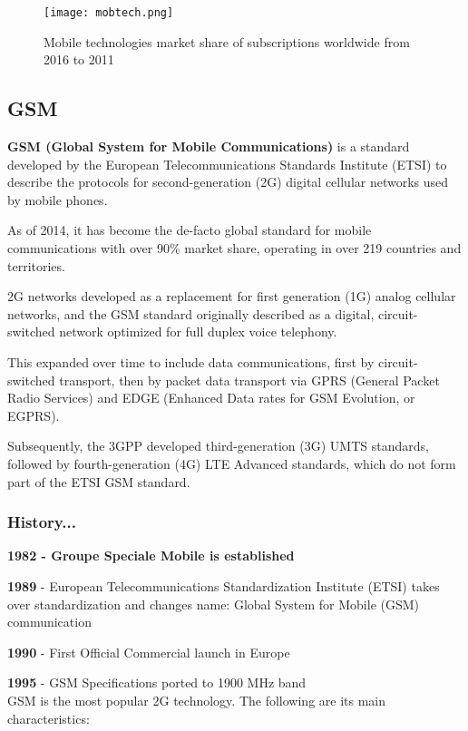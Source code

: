 \begin{figure}[H]
  \centering
  \texttt{[image: mobtech.png]}
  \caption{Mobile technologies market share of subscriptions worldwide from
  2016 to 2011}
  \label{fig:mobtech}
\end{figure}

\subsection{GSM}

\textbf{GSM (Global System for Mobile Communications)} is a standard
developed by the European Telecommunications Standards Institute (ETSI) to
describe the protocols for second-generation (2G) digital cellular networks
used by mobile phones.

As of 2014, it has become the de-facto global standard for mobile communications
with over 90\% market share, operating in over 219 countries and territories.

2G networks developed as a replacement for first generation (1G) analog cellular
networks, and the GSM standard originally described as a digital,
circuit-switched network optimized for full duplex voice telephony.

This expanded over time to include data communications, first by
circuit-switched transport, then by packet data transport via GPRS
(General Packet Radio Services) and EDGE (Enhanced Data rates for GSM Evolution,
or EGPRS).

Subsequently, the 3GPP developed third-generation (3G) UMTS standards, followed
by fourth-generation (4G) LTE Advanced standards, which do not form part of the
ETSI GSM standard.

\subsubsection{History...}

\textbf{1982 - Groupe Speciale Mobile is established}

\textbf{1989} - European Telecommunications Standardization Institute
(ETSI) takes over standardization and changes name: Global System for Mobile
(GSM) communication

\textbf{1990} - First Official Commercial launch in Europe

\textbf{1995} - GSM Specifications ported to 1900 MHz band \\

GSM is the most popular 2G technology. The following are its main
characteristics:

